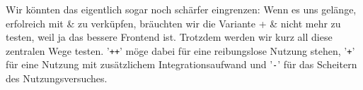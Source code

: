 Wir könnten das eigentlich sogar noch schärfer eingrenzen: Wenn es uns gelänge,
 erfolreich mit  \&  zu verküpfen,
bräuchten wir die Variante  +  \& 
nicht mehr zu testen, weil ja  das bessere Frontend ist. Trotzdem
werden wir kurz all diese zentralen Wege testen. '\texttt{++}' möge dabei für
eine reibungslose Nutzung stehen, '\texttt{+}' für eine Nutzung mit zusätzlichem
Integrationsaufwand und '\texttt{-}' für das Scheitern des Nutzungsversuches.



%
